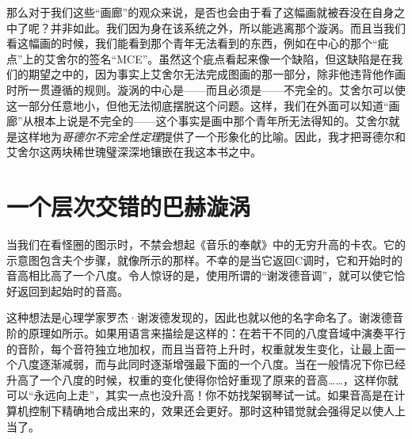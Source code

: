 那么对于我们这些“画廊”的观众来说，是否也会由于看了这幅画就被吞没在自身之中了呢？并非如此。我们因为身在该系统之外，所以能逃离那个漩涡。而且当我们看这幅画的时候，我们能看到那个青年无法看到的东西，例如在中心的那个“疵点”上的艾舍尔的签名“MCE”。虽然这个疵点看起来像一个缺陷，但这缺陷是在我们的期望之中的，因为事实上艾舍尔无法完成图画的那一部分，除非他违背他作画时所一贯遵循的规则。漩涡的中心是——而且必须是——不完全的。艾舍尔可以使这一部分任意地小，但他无法彻底摆脱这个问题。这样，我们在外面可以知道“画廊”从根本上说是不完全的——这个事实是画中那个青年所无法得知的。艾舍尔就是这样地为\emph{哥德尔不完全性定理}提供了一个形象化的比喻。因此，我才把哥德尔和艾舍尔这两块稀世瑰璧深深地镶嵌在我这本书之中。

\section{一个层次交错的巴赫漩涡}

当我们在看怪圈的图示时，不禁会想起《音乐的奉献》中的无穷升高的卡农。它的示意图包含夫个步骤，就像所示的那样。不幸的是当它返回C调时，它和开始时的音高相比高了一个八度。令人惊讶的是，使用所谓的“谢泼德音调”，就可以使它恰好返回到起始时的音高。

\begin{figure}
\begin{lrbox}{\TEMPBOX}%
\end{lrbox}
\end{figure}

这种想法是心理学家罗杰·谢泼德发现的，因此也就以他的名字命名了。谢泼德音阶的原理如所示。如果用语言来描绘是这样的：在若干不同的八度音域中演奏平行的音阶，每个音符独立地加权，而且当音符上升时，权重就发生变化，让最上面一个八度逐渐减弱，而与此同时逐渐增强最下面的一个八度。当在一般情况下你已经升高了一个八度的时候，权重的变化使得你恰好重现了原来的音高……，这样你就可以“永远向上走”，其实一点也没升高！你不妨找架钢琴试一试。如果音高是在计算机控制下精确地合成出来的，效果还会更好。那时这种错觉就会强得足以使人上当了。

